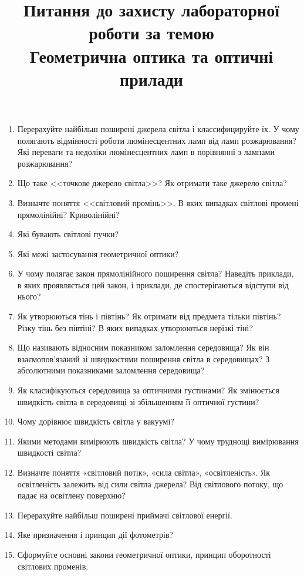 \documentclass[12pt]{article}
\title{Питання до захисту лабораторної роботи за темою\\ {\bfseries Геометрична оптика та оптичні прилади}}
\author{}
\date{}
\begin{document}
\maketitle

\noindent%
\begin{enumerate}[label*=\bfseries\color{red!60!black}\arabic*.,ref=\arabic*, wide,leftmargin=*]
\item Перерахуйте найбільш поширені джерела світла і классифицируйте їх. У чому полягають відмінності роботи люмінесцентних ламп від ламп розжарювання? Які переваги та недоліки люмінесцентних ламп в порівнянні з лампами розжарювання?
\item Що таке <<точкове джерело світла>>? Як отримати таке джерело світла?
\item Визначте поняття <<світловий промінь>>. В яких випадках світлові промені прямолінійні? Криволінійні?
\item Які бувають світлові пучки?
\item Які межі застосування геометричної оптики?
\item У чому полягає закон прямолінійного поширення світла? Наведіть приклади, в яких проявляється цей закон, і приклади, де спостерігаються відступи від нього?
\item Як утворюються тінь і півтінь? Як отримати від предмета тільки півтінь? Різку тінь без півтіні? В яких випадках утворюються нерізкі тіні?
\item Що називають відносним показником заломлення середовища? Як він взаємопов'язаний зі швидкостями поширення світла в середовищах? З абсолютними показниками заломлення середовища?
\item Як класифікуються середовища за оптичними густинами? Як змінюється швидкість світла в середовищі зі збільшенням її оптичної густини?
\item Чому дорівнює швидкість світла у вакуумі?
\item Якими методами вимірюють швидкість світла? У чому труднощі вимірювання швидкості світла?
\item Визначте поняття «світловий потік», «сила світла», «освітленість». Як освітленість залежить від сили світла джерела? Від світлового потоку, що падає на освітлену поверхню?
\item Перерахуйте найбільш поширені приймачі світлової енергії.
\item Яке призначення і принцип дії фотометрів?
\item Сформуйте основні закони геометричної оптики, принцип оборотності світлових променів. 

\end{enumerate}
\end{document}
